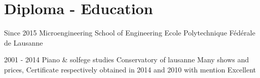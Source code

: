 \documentclass[]{friggeri-cv}
\begin{document}
	\section{Diploma - Education}
	
	\begin{entrylist}
		
		\entry
		{Since 2015}
		{Microengineering}
		{School of Engineering}
		{Ecole Polytechnique Fédérale de Lausanne}
		
		
		\entry
		{2001 - 2014}
		{Piano \& solfege studies}
		{Conservatory of lausanne}
		{Many shows and prices, Certificate respectively obtained in 2014 and 2010 with mention Excellent}
		
		
	\end{entrylist}
	
%	
%				
%		
%		
\end{document}
